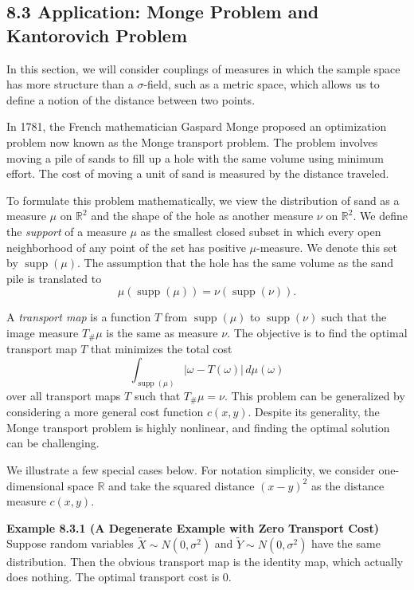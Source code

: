 \subsection*{8.3 Application: Monge Problem and Kantorovich Problem}

In this section, we will consider couplings of measures in which the sample space has more structure than a $\sigma$-field, such as a metric space, which allows us to define a notion of the distance between two points.

In 1781, the French mathematician Gaspard Monge proposed an optimization problem now known as the Monge transport problem. The problem involves moving a pile of sands to fill up a hole with the same volume using minimum effort. The cost of moving a unit of sand is measured by the distance traveled.

To formulate this problem mathematically, we view the distribution of sand as a measure $\mu$ on $\mathbb{R}^2$ and the shape of the hole as another measure $\nu$ on $\mathbb{R}^2$. We define the \textit{support} of a measure $\mu$ as the smallest closed subset in which every open neighborhood of any point of the set has positive $\mu$-measure. We denote this set by $\operatorname{supp}(\mu)$. The assumption that the hole has the same volume as the sand pile is translated to
\[
\mu(\operatorname{supp}(\mu)) = \nu(\operatorname{supp}(\nu)).
\]

A \textit{transport map} is a function $T$ from $\operatorname{supp}(\mu)$ to $\operatorname{supp}(\nu)$ such that the image measure $T_{\#}\mu$ is the same as measure $\nu$. The objective is to find the optimal transport map $T$ that minimizes the total cost
\[
\int_{\operatorname{supp}(\mu)} |\omega-T(\omega)|\, d\mu(\omega)
\]
over all transport maps $T$ such that $T_{\#}\mu=\nu$. This problem can be generalized by considering a more general cost function $c(x,y)$. Despite its generality, the Monge transport problem is highly nonlinear, and finding the optimal solution can be challenging.

We illustrate a few special cases below. For notation simplicity, we consider one-dimensional space $\mathbb{R}$ and take the squared distance $(x-y)^2$ as the distance measure $c(x,y)$.

\textbf{Example 8.3.1 (A Degenerate Example with Zero Transport Cost)} \\
Suppose random variables $\tilde{X}\sim N(0,\sigma^2)$ and $\tilde{Y}\sim N(0,\sigma^2)$ have the same distribution. Then the obvious transport map is the identity map, which actually does nothing. The optimal transport cost is 0.


